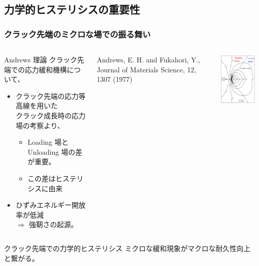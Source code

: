 \documentclass[11pt, dvipdfmx]{beamer}
\begin{document}
\begin{frame}
\begin{columns}[totalwidth=1\textwidth]
\end{columns}


\end{frame}


\subsection{力学的ヒステリシスの重要性}
%
\begin{frame}
\frametitle{クラック先端のミクロな場での振る舞い}

%

\small

\begin{columns}[totalwidth=1\textwidth]
\begin{exampleblock}{\Large Andrews 理論}
クラック先端での応力緩和機構について、
	\begin{itemize}
	\item
	クラック先端の応力等高線を用いた\\
	クラック成長時の応力場の考察より、
		\begin{itemize}
		\item
		\alert{Loading 場とUnloading 場の差}が重要。
		\item
		この差は\alert{ヒステリシスに由来}
		\end{itemize}	
	\item
	\alert{ひずみエネルギー開放率が低減} \\$\Rightarrow$ 強靭さの起源。
	\end{itemize}
\end{exampleblock}

{Andrews, E. H. and Fukahori, Y., Journal of Materials Science, 12, 1307 (1977)}

\centering
\includegraphics[width=40mm]{./fig/crack.png}
\end{columns}

\begin{alertblock}{クラック先端での力学的ヒステリシス}
ミクロな緩和現象がマクロな耐久性向上と繋がる。
\end{alertblock}

\end{frame}
\end{document}

